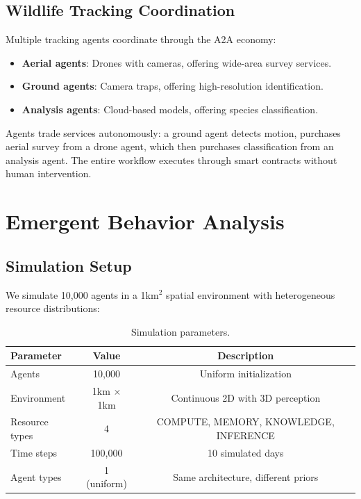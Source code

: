 \documentclass[11pt,letterpaper]{article}
\begin{document}
\subsection{Wildlife Tracking Coordination}

Multiple tracking agents coordinate through the A2A economy:

\begin{itemize}
    \item \textbf{Aerial agents}: Drones with cameras, offering wide-area survey services.
    \item \textbf{Ground agents}: Camera traps, offering high-resolution identification.
    \item \textbf{Analysis agents}: Cloud-based models, offering species classification.
\end{itemize}

Agents trade services autonomously: a ground agent detects motion, purchases aerial survey from a drone agent, which then purchases classification from an analysis agent. The entire workflow executes through smart contracts without human intervention.

\section{Emergent Behavior Analysis}

\subsection{Simulation Setup}

We simulate 10,000 agents in a 1km$^2$ spatial environment with heterogeneous resource distributions:

\begin{table}[t]
\centering
\begin{tabular}{lcc}
\toprule
\textbf{Parameter} & \textbf{Value} & \textbf{Description} \\
\midrule
Agents & 10,000 & Uniform initialization \\
Environment & 1km $\times$ 1km & Continuous 2D with 3D perception \\
Resource types & 4 & COMPUTE, MEMORY, KNOWLEDGE, INFERENCE \\
Time steps & 100,000 & 10 simulated days \\
Agent types & 1 (uniform) & Same architecture, different priors \\
\bottomrule
\end{tabular}
\caption{Simulation parameters.}
\label{tab:sim_params}
\end{table}
\end{document}
